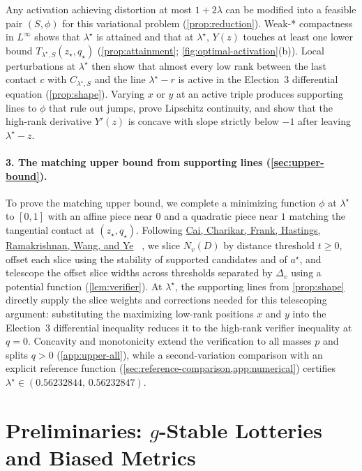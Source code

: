 \documentclass[11pt]{article}
\newcommand{\citelink}[2]{%
  \hyperlink{cite.#2}{\textcolor{CitationBlue}{#1}}%
}
\numberwithin{equation}{section}
\theoremstyle{plain}
\theoremstyle{definition}
\newcommand{\1}{\mathbf{1}}
\begin{document}
Any activation achieving distortion at most $1 + 2\lambda$ can be modified into a feasible pair $(S, \phi)$ for this variational problem (\cref{prop:reduction}). Weak-* compactness in $L^\infty$ shows that $\lambda^\star$ is attained and that at $\lambda^\star$, $Y(z)$ touches at least one lower bound $T_{\lambda^\star, S}(z_\star, q_\star)$ (\cref{prop:attainment}; \cref{fig:optimal-activation}(b)). Local perturbations at $\lambda^\star$ then show that almost every low rank between the last contact $c$ with $C_{\lambda^\star, S}$ and the line $\lambda^\star - r$ is active in the Election~3 differential equation (\cref{prop:shape}). Varying $x$ or $y$ at an active triple produces supporting lines to $\phi$ that rule out jumps, prove Lipschitz continuity, and show that the high-rank derivative $Y'(z)$ is concave with slope strictly below $-1$ after leaving $\lambda^\star - z$.

\paragraph{3. The matching upper bound from supporting lines (\cref{sec:upper-bound}).}
To prove the matching upper bound, we complete a minimizing function $\phi$ at $\lambda^\star$ to $[0, 1]$ with an affine piece near $0$ and a quadratic piece near $1$ matching the tangential contact at $(z_\star, q_\star)$. Following \citelink{Cai, Charikar, Frank, Hastings, Ramakrishnan, Wang, and Ye}{CaiEtAl26b}~\cite{CaiEtAl26b}, we slice $N_v(D)$ by distance threshold $t \ge 0$, offset each slice using the stability of supported candidates and of $a^\star$, and telescope the offset slice widths across thresholds separated by $\Delta_v$ using a potential function (\cref{lem:verifier}). At $\lambda^\star$, the supporting lines from \cref{prop:shape} directly supply the slice weights and corrections needed for this telescoping argument: substituting the maximizing low-rank positions $x$ and $y$ into the Election~3 differential inequality reduces it to the high-rank verifier inequality at $q = 0$. Concavity and monotonicity extend the verification to all masses $p$ and splits $q > 0$ (\cref{app:upper-all}), while a second-variation comparison with an explicit reference function (\cref{sec:reference-comparison,app:numerical}) certifies $\lambda^\star \in (0.56232844,\, 0.56232847)$.

\section{Preliminaries: \texorpdfstring{$g$}{g}-Stable Lotteries and Biased Metrics}
\label{sec:preliminaries}
\end{document}
